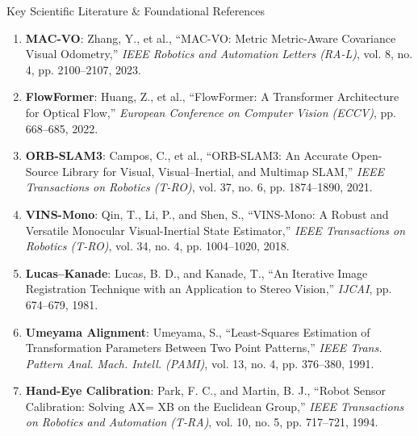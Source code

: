 \documentclass[aspectratio=169, 10pt]{beamer}
\begin{document}
\begin{frame}{Key Scientific Literature \& Foundational References}
  \scriptsize
  \begin{enumerate}
    \setlength{\itemsep}{4pt}
    \item \textbf{MAC-VO}: Zhang, Y., et al., ``MAC-VO: Metric Metric-Aware Covariance Visual Odometry,'' \textit{IEEE Robotics and Automation Letters (RA-L)}, vol. 8, no. 4, pp. 2100--2107, 2023.
    \item \textbf{FlowFormer}: Huang, Z., et al., ``FlowFormer: A Transformer Architecture for Optical Flow,'' \textit{European Conference on Computer Vision (ECCV)}, pp. 668--685, 2022.
    \item \textbf{ORB-SLAM3}: Campos, C., et al., ``ORB-SLAM3: An Accurate Open-Source Library for Visual, Visual--Inertial, and Multimap SLAM,'' \textit{IEEE Transactions on Robotics (T-RO)}, vol. 37, no. 6, pp. 1874--1890, 2021.
    \item \textbf{VINS-Mono}: Qin, T., Li, P., and Shen, S., ``VINS-Mono: A Robust and Versatile Monocular Visual-Inertial State Estimator,'' \textit{IEEE Transactions on Robotics (T-RO)}, vol. 34, no. 4, pp. 1004--1020, 2018.
    \item \textbf{Lucas--Kanade}: Lucas, B. D., and Kanade, T., ``An Iterative Image Registration Technique with an Application to Stereo Vision,'' \textit{IJCAI}, pp. 674--679, 1981.
    \item \textbf{Umeyama Alignment}: Umeyama, S., ``Least-Squares Estimation of Transformation Parameters Between Two Point Patterns,'' \textit{IEEE Trans. Pattern Anal. Mach. Intell. (PAMI)}, vol. 13, no. 4, pp. 376--380, 1991.
    \item \textbf{Hand-Eye Calibration}: Park, F. C., and Martin, B. J., ``Robot Sensor Calibration: Solving AX= XB on the Euclidean Group,'' \textit{IEEE Transactions on Robotics and Automation (T-RA)}, vol. 10, no. 5, pp. 717--721, 1994.
  \end{enumerate}
\end{frame}
\end{document}
